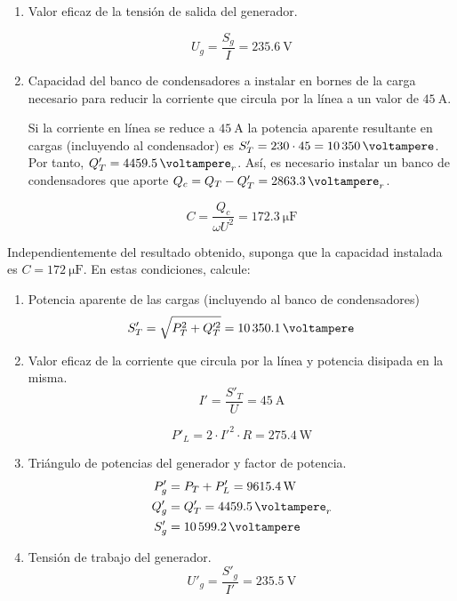 \begin{enumerate}
\item Valor eficaz de la tensión de salida del generador.

  \[
    U_g = \frac{S_g}{I} = \SI{235.6}{\volt}
  \]

\item Capacidad del banco de condensadores a instalar en bornes de la carga necesario para reducir la corriente que circula por la línea a un valor de $\SI{45}{\ampere}$.

  Si la corriente en línea se reduce a $\SI{45}{\ampere}$ la potencia aparente resultante en cargas (incluyendo al condensador) es $S'_T = 230 \cdot 45 = \SI{10350}{\voltampere}$. Por tanto, $Q'_T = \SI{4459.5}{\voltampere}_r$. Así, es necesario instalar un banco de condensadores que aporte $Q_c = Q_T - Q'_T = \SI{2863.3}{\voltampere}_r$.

\[
C = \frac{Q_c}{\omega U^2} = \SI{172.3}{\micro\farad}
\]

  
\end{enumerate}

Independientemente del resultado obtenido, suponga que la capacidad instalada es $C = \SI{172}{\micro\farad}$. En estas condiciones, calcule:
\begin{enumerate}[resume]
\item Potencia aparente de las cargas (incluyendo al banco de condensadores)
\[
S'_T = \sqrt{P^2_T + Q'^2_T} = \SI{10350.1}{\voltampere}
\]

\item Valor eficaz de la corriente que circula por la línea y potencia disipada en la misma.
\[
I' = \frac{S'_T}{U} = \SI{45}{\ampere}
\]

\[
  P'_L = 2 \cdot I'^2 \cdot R = \SI{275.4}{\watt}
\]

\item Triángulo de potencias del generador y factor de potencia.
  \begin{align*}
    P'_g &= P_T + P'_L = \SI{9615.4}{\watt}\\
    Q'_g &= Q'_T = \SI{4459.5}{\voltampere}_r\\
    S'_g &= \SI{10599.2}{\voltampere}\\    
  \end{align*}

\item Tensión de trabajo del generador.
\[
U'_g = \frac{S'_g}{I'} = \SI{235.5}{\volt}
\]
\end{enumerate}

